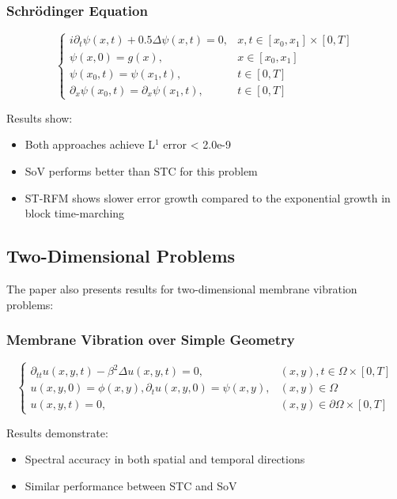 \documentclass[11pt]{article}
\begin{document}
\subsubsection{Schrödinger Equation}
\begin{equation}
\begin{cases}
i\partial_t \psi(x,t) + 0.5 \Delta \psi(x,t) = 0, & x, t \in [x_0, x_1] \times [0,T] \\
\psi(x, 0) = g(x), & x \in [x_0, x_1] \\
\psi(x_0, t) = \psi(x_1, t), & t \in [0,T] \\
\partial_x \psi(x_0, t) = \partial_x \psi(x_1, t), & t \in [0,T]
\end{cases}
\end{equation}

Results show:
\begin{itemize}
    \item Both approaches achieve L$^1$ error < 2.0e-9
    \item SoV performs better than STC for this problem
    \item ST-RFM shows slower error growth compared to the exponential growth in block time-marching
\end{itemize}

\subsection{Two-Dimensional Problems}

The paper also presents results for two-dimensional membrane vibration problems:

\subsubsection{Membrane Vibration over Simple Geometry}
\begin{equation}
\begin{cases}
\partial_{tt} u(x,y,t) - \beta^2 \Delta u(x,y,t) = 0, & (x,y), t \in \Omega \times [0,T] \\
u(x,y,0) = \phi(x,y), \partial_t u(x,y,0) = \psi(x,y), & (x,y) \in \Omega \\
u(x,y,t) = 0, & (x,y) \in \partial\Omega \times [0,T]
\end{cases}
\end{equation}

Results demonstrate:
\begin{itemize}
    \item Spectral accuracy in both spatial and temporal directions
    \item Similar performance between STC and SoV
\end{itemize}
\end{document}
